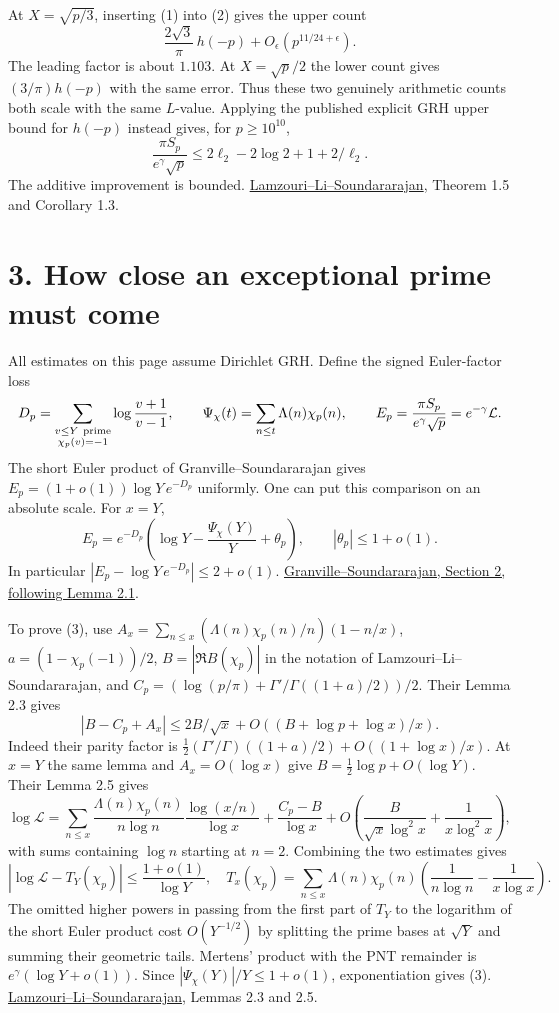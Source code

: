 \documentclass[11pt]{article}
\newcommand{\LL}{\mathcal L}
\newcommand{\ch}{\chi_p}
\newcommand{\lls}{\href{https://arxiv.org/pdf/1309.3595}{Lamzouri--Li--Soundararajan}}
\begin{document}
At $X=\sqrt{p/3}$, inserting (1) into (2) gives the upper count
\[
 \frac{2\sqrt3}{\pi}\,h(-p)+O_\epsilon(p^{11/24+\epsilon}).
\]
The leading factor is about $1.103$. At $X=\sqrt p/2$ the lower count gives $(3/\pi)h(-p)$ with the same error. Thus these two genuinely arithmetic counts both scale with the same $L$-value. Applying the published explicit GRH upper bound for $h(-p)$ instead gives, for $p\ge10^{10}$,
\[
 \frac{\pi S_p}{e^\gamma\sqrt p}\le 2\ell_2-2\log2+1+2/\ell_2.
\]
The additive improvement is bounded. \lls, Theorem 1.5 and Corollary 1.3.

\newpage
\section*{3. How close an exceptional prime must come}
All estimates on this page assume Dirichlet GRH. Define the signed Euler-factor loss
\[
 D_p=\sum_{\substack{v\le Y\ {\rm prime}\\\ch(v)=-1}}
                         \log\frac{v+1}{v-1},\qquad
 \Psi_\chi(t)=\sum_{n\le t}\Lambda(n)\ch(n),\qquad
 E_p=\frac{\pi S_p}{e^\gamma\sqrt p}=e^{-\gamma}\LL .
\]
The short Euler product of Granville--Soundararajan gives $E_p=(1+o(1))\log Y\,e^{-D_p}$ uniformly. One can put this comparison on an absolute scale. For $x=Y$,
\begin{equation}
 E_p=e^{-D_p}\left(\log Y-\frac{\Psi_\chi(Y)}Y+\theta_p\right),
                    \qquad |\theta_p|\le1+o(1).
\end{equation}
In particular $|E_p-\log Y\,e^{-D_p}|\le2+o(1)$. \href{https://arxiv.org/pdf/math/0206031}{Granville--Soundararajan, Section 2, following Lemma 2.1}.

To prove (3), use $A_x=\sum_{n\le x}(\Lambda(n)\ch(n)/n)(1-n/x)$,
$a=(1-\ch(-1))/2$, $B=|\Re B(\ch)|$ in the notation of Lamzouri--Li--Soundararajan, and
$C_p=(\log(p/\pi)+\Gamma'/\Gamma((1+a)/2))/2$.
Their Lemma 2.3 gives
\[
 |B-C_p+A_x|\le 2B/\sqrt x+O((B+\log p+\log x)/x).
\]
Indeed their parity factor is $\frac12(\Gamma'/\Gamma)((1+a)/2)+O((1+\log x)/x)$. At $x=Y$ the same lemma and $A_x=O(\log x)$ give $B=\frac12\log p+O(\log Y)$. Their Lemma 2.5 gives
\[
 \log\LL=\sum_{n\le x}\frac{\Lambda(n)\ch(n)}{n\log n}
                 \frac{\log(x/n)}{\log x}
       +\frac{C_p-B}{\log x}
       +O\!\left(\frac{B}{\sqrt x\log^2 x}+\frac1{x\log^2 x}\right),
\]
with sums containing $\log n$ starting at $n=2$. Combining the two estimates gives
\[
 \left|\log\LL-T_Y(\ch)\right|\le\frac{1+o(1)}{\log Y},
 \quad T_x(\ch)=\sum_{n\le x}\Lambda(n)\ch(n)
                  \left(\frac1{n\log n}-\frac1{x\log x}\right).
\]
The omitted higher powers in passing from the first part of $T_Y$ to the logarithm of the short Euler product cost $O(Y^{-1/2})$ by splitting the prime bases at $\sqrt Y$ and summing their geometric tails. Mertens' product with the PNT remainder is $e^\gamma(\log Y+o(1))$. Since $|\Psi_\chi(Y)|/Y\le1+o(1)$, exponentiation gives (3). \lls, Lemmas 2.3 and 2.5.
\end{document}
